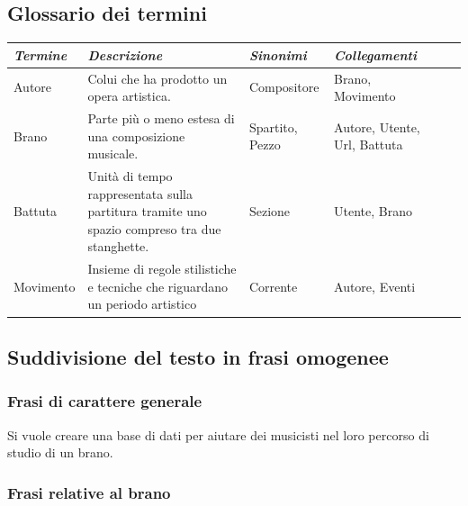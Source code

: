 \documentclass{article}
\begin{document}
    \subsection{Glossario dei termini}


    \begin{tabular}{l p{5cm} l p{2cm} l l}
        \toprule
        \textbf{\textit{Termine}} & \textbf{\textit{Descrizione}} & \textbf{\textit{Sinonimi}} & \textbf{\textit{Collegamenti}} \\
        \midrule
        Autore & Colui che ha prodotto un opera artistica. & Compositore & Brano, \newline Movimento \\
        \midrule
        Brano & Parte più o meno estesa di una composizione musicale. & Spartito, \newline  Pezzo  & Autore, \newline Utente, \newline Url, \newline Battuta \\
        \midrule
        Battuta & Unità di tempo rappresentata sulla partitura tramite uno spazio compreso tra due stanghette. & Sezione & Utente, \newline Brano \\
        \midrule
        Movimento & Insieme di regole stilistiche e tecniche che riguardano un periodo artistico & Corrente & Autore, \newline Eventi \\
        \bottomrule
    \end{tabular}

    \subsection{Suddivisione del testo in frasi omogenee}

    \subsubsection{Frasi di carattere generale}

    Si vuole creare una base di dati per aiutare dei musicisti nel loro percorso di studio di un brano.\\

    \subsubsection{Frasi relative al brano}
\end{document}
